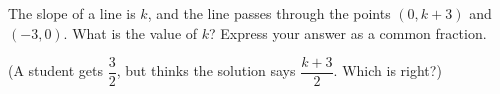 The slope of a line is $k$, and the line passes through the points $(0,k+3)$ and $(-3,0)$. What is the value of $k$? Express your answer as a common fraction.

(A student gets $\dfrac{3}{2}$, but thinks the solution says $\dfrac{k+3}{2}$. Which is right?)
